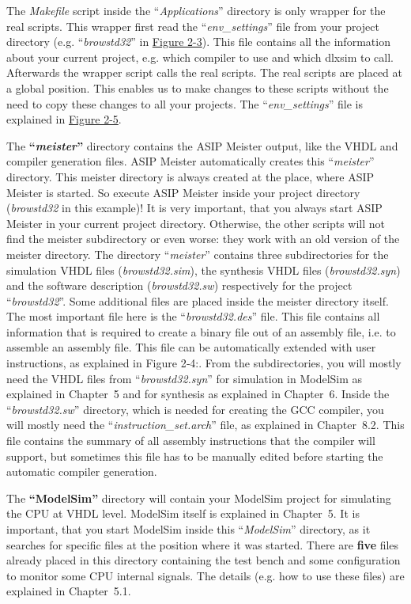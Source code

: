 \documentclass[
]{article}
\begin{document}
The \emph{Makefile} script inside the ``\emph{Applications}'' directory
is only wrapper for the real scripts. This wrapper first read the
``\emph{env\_settings}'' file from your project directory (e.g.
``\emph{browstd32}'' in \protect\hyperlink{Fig23}{Figure 2-3}). This
file contains all the information about your current project, e.g. which
compiler to use and which dlxsim to call. Afterwards the wrapper script
calls the real scripts. The real scripts are placed at a global
position. This enables us to make changes to these scripts without the
need to copy these changes to all your projects. The
``\emph{env\_settings}'' file is explained in
\protect\hyperlink{Fig25}{Figure 2-5}.

The \textbf{``\emph{meister}''} directory contains the ASIP Meister
output, like the VHDL and compiler generation files. ASIP Meister
automatically creates this ``\emph{meister}'' directory. This meister
directory is always created at the place, where ASIP Meister is started.
So execute ASIP Meister inside your project directory (\emph{browstd32}
in this example)! It is very important, that you always start ASIP
Meister in your current project directory. Otherwise, the other scripts
will not find the meister subdirectory or even worse: they work with an
old version of the meister directory. The directory ``\emph{meister}''
contains three subdirectories for the simulation VHDL files
(\emph{browstd32.sim}), the synthesis VHDL files (\emph{browstd32.syn})
and the software description (\emph{browstd32.sw}) respectively for the
project ``\emph{browstd32}''. Some additional files are placed inside
the meister directory itself. The most important file here is the
``\emph{browstd32.des}'' file. This file contains all information that
is required to create a binary file out of an assembly file, i.e. to
assemble an assembly file. This file can be automatically extended with
user instructions, as explained in Figure 2‑4:. From the subdirectories,
you will mostly need the VHDL files from ``\emph{browstd32.syn}'' for
simulation in ModelSim as explained in Chapter~5 and for synthesis as
explained in Chapter~6. Inside the ``\emph{browstd32.sw}'' directory,
which is needed for creating the GCC compiler, you will mostly need the
``\emph{instruction\_set.arch}'' file, as explained in Chapter~8.2. This
file contains the summary of all assembly instructions that the compiler
will support, but sometimes this file has to be manually edited before
starting the automatic compiler generation.

The \textbf{``ModelSim''} directory will contain your ModelSim project
for simulating the CPU at VHDL level. ModelSim itself is explained in
Chapter~5. It is important, that you start ModelSim inside this
``\emph{ModelSim}'' directory, as it searches for specific files at the
position where it was started. There are \textbf{five} files already
placed in this directory containing the test bench and some
configuration to monitor some CPU internal signals. The details (e.g.
how to use these files) are explained in Chapter~5.1.
\end{document}
